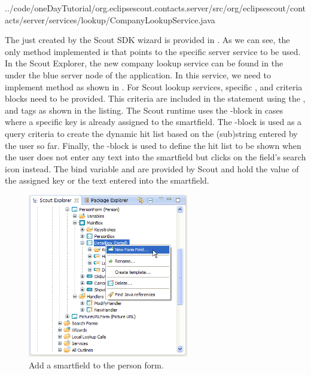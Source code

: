 \documentclass[a4paper,10pt,twoside]{book}
\begin{document}

{../code/oneDayTutorial/org.eclipsescout.contacts.server/src/org/eclipsescout/contacts/server/services/lookup/CompanyLookupService.java}

The  just created by the Scout SDK wizard is provided in . 
As we can see, the only method implemented is  that points to the specific server service to be used. 
In the Scout Explorer, the new company lookup service can be found in the  under the blue server node of the application. 
In this service, we need to implement method  as shown in . 
For Scout lookup services, specific ,  and  criteria blocks need to be provided. 
This criteria are included in the  statement using the ,  and  tags as shown in the listing. 
The Scout runtime uses the -block in cases where a specific key is already assigned to the smartfield. 
The -block is used as a query criteria to create the dynamic  hit list based on the (sub)string entered by the user so far.
Finally, the -block is used to define the hit list to be shown when the user does not enter any text into the smartfield but clicks on the field's search icon instead. 
The bind variable  and  are provided by Scout and hold the value of the assigned key or the text entered into the smartfield. 

\begin{figure}
\includegraphics[width=7cm]{new_smartfield_company_contextmenu.png}
\caption{Add a smartfield to the person form.}
\end{figure}
\end{document}
